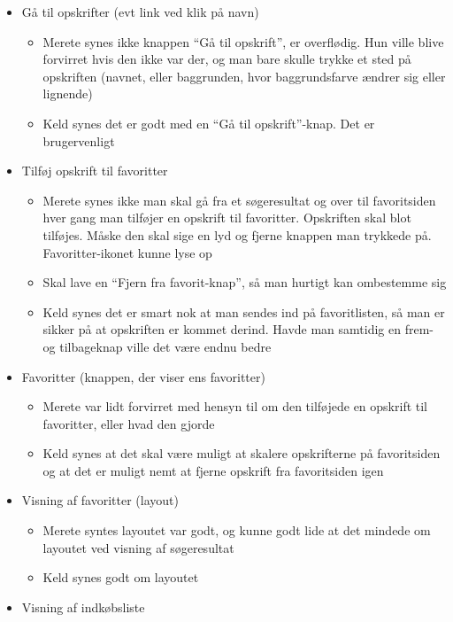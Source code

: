 \begin{description}
\begin{itemize}[noitemsep]
\begin{itemize}[noitemsep]
\end{itemize}
\item Gå til opskrifter (evt link ved klik på navn)
\begin{itemize}[noitemsep]
\item Merete synes ikke knappen “Gå til opskrift”, er overflødig. Hun ville blive forvirret hvis den ikke var der, og man bare skulle trykke et sted på opskriften (navnet, eller baggrunden, hvor baggrundsfarve ændrer sig eller lignende)
\item Keld synes det er godt med en “Gå til opskrift”-knap. Det er brugervenligt
\end{itemize}
\item Tilføj opskrift til favoritter
\begin{itemize}[noitemsep]
\item Merete synes ikke man skal gå fra et søgeresultat og over til favoritsiden hver gang man tilføjer en opskrift til favoritter. Opskriften skal blot tilføjes. Måske den skal sige en lyd og fjerne knappen man trykkede på. Favoritter-ikonet kunne lyse op
\item Skal lave en “Fjern fra favorit-knap”, så man hurtigt kan ombestemme sig
\item Keld synes det er smart nok at man sendes ind på favoritlisten, så man er sikker på at opskriften er kommet derind. Havde man samtidig en frem- og tilbageknap ville det være endnu bedre
\end{itemize}
\item Favoritter (knappen, der viser ens favoritter)
\begin{itemize}[noitemsep]
\item Merete var lidt forvirret med hensyn til om den tilføjede en opskrift til favoritter, eller hvad den gjorde
\item Keld synes at det skal være muligt at skalere opskrifterne på favoritsiden og at det er muligt nemt at fjerne opskrift fra favoritsiden igen
\end{itemize}
\item Visning af favoritter (layout)
\begin{itemize}[noitemsep]
\item Merete syntes layoutet var godt, og kunne godt lide at det mindede om layoutet ved visning af søgeresultat
\item Keld synes godt om layoutet
\end{itemize}
\item Visning af indkøbsliste
\begin{itemize}[noitemsep]

\end{itemize}
\end{itemize}
\end{description}
